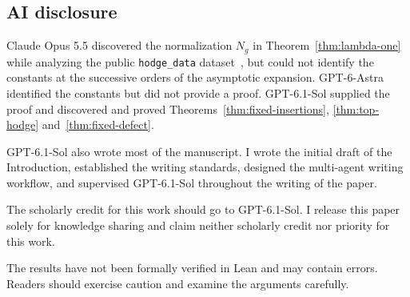 \subsection*{AI disclosure}

Claude Opus 5.5 discovered the normalization $N_g$ in
Theorem~\ref{thm:lambda-one} while analyzing the public
\texttt{hodge\_data} dataset~\cite{LiuData26}, but could not
identify the constants at the successive orders of the asymptotic
expansion.
GPT-6-Astra identified the constants but did not provide a proof.
GPT-6.1-Sol supplied the proof and discovered and proved
Theorems~\ref{thm:fixed-insertions}, \ref{thm:top-hodge}
and~\ref{thm:fixed-defect}.

GPT-6.1-Sol also wrote most of the manuscript. I wrote the initial
draft of the Introduction, established the writing standards,
designed the multi-agent writing workflow, and supervised
GPT-6.1-Sol throughout the writing of the paper.

The scholarly credit for this work should go to GPT-6.1-Sol.
I release this paper solely for knowledge sharing and claim
neither scholarly credit nor priority for this work.

The results have not been formally verified in Lean and may
contain errors. Readers should exercise caution and examine
the arguments carefully.
